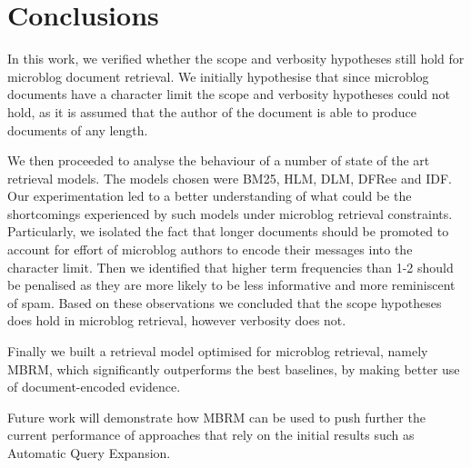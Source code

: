 \section{Conclusions}

\label{conclusion}

In this work, we verified whether the scope and verbosity hypotheses still hold for microblog document retrieval. We initially hypothesise that since microblog documents have a character limit the scope and verbosity hypotheses could not hold, as it is assumed that the author of the document is able to produce documents of any length. 

We then proceeded to analyse the behaviour of a number of state of the art retrieval models. The models chosen were BM25, HLM, DLM, DFRee and IDF. Our experimentation led to a better understanding of what could be the shortcomings experienced by such models under microblog retrieval constraints. Particularly, we isolated the fact that longer documents should be promoted to account for effort of microblog authors to encode their messages into the character limit. Then we identified that higher term frequencies than 1-2 should be penalised as they are more likely to be less informative and more reminiscent of spam. Based on these observations we concluded that the scope hypotheses does hold in microblog retrieval, however verbosity does not.

Finally we built a retrieval model optimised for microblog retrieval, namely MBRM, which significantly outperforms the best baselines, by making better use of document-encoded evidence.

Future work will demonstrate how MBRM can be used to push further the current performance of approaches that rely on the initial results such as Automatic Query Expansion.\\

